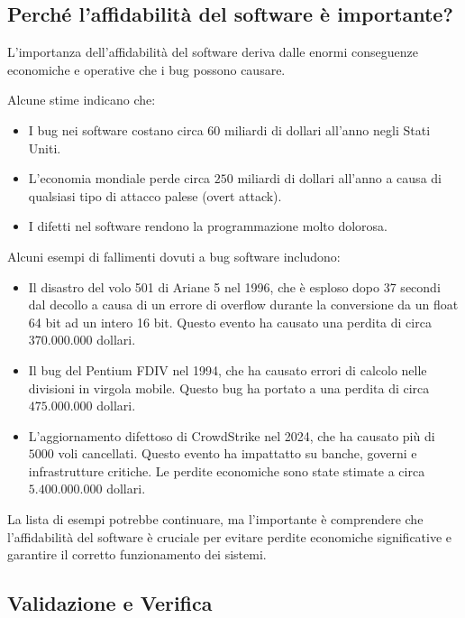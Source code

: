 \subsection{Perché l'affidabilità del software è importante?}

L'importanza dell'affidabilità del software deriva dalle enormi conseguenze
economiche e operative che i bug possono causare.

Alcune stime indicano che:
\begin{itemize}
    \item I bug nei software costano circa \(60\) miliardi di dollari all'anno
    negli Stati Uniti.
    \item L'economia mondiale perde circa \(250\) miliardi di dollari all'anno
    a causa di qualsiasi tipo di attacco palese (overt attack).
    \item I difetti nel software rendono la programmazione molto dolorosa.
\end{itemize}

Alcuni esempi di fallimenti dovuti a bug software includono:
\begin{itemize}
    \item Il disastro del volo 501 di Ariane 5 nel 1996, che è esploso dopo 37 secondi
    dal decollo a causa di un errore di overflow durante la conversione da un float 64 bit ad un intero 16 bit.
    Questo evento ha causato una perdita di circa \(370.000.000\) dollari.
    \item Il bug del Pentium FDIV nel 1994, che ha causato errori di calcolo
    nelle divisioni in virgola mobile. Questo bug ha portato a una perdita di
    circa \(475.000.000\) dollari.
    \item L'aggiornamento difettoso di CrowdStrike nel 2024, che ha causato
    più di \(5000\) voli cancellati. Questo evento ha impattatto su banche,
    governi e infrastrutture critiche. Le perdite economiche sono state
    stimate a circa \(5.400.000.000\) dollari.
\end{itemize}

La lista di esempi potrebbe continuare, ma l'importante è comprendere
che l'affidabilità del software è cruciale per evitare perdite economiche
significative e garantire il corretto funzionamento dei sistemi.

\subsection{Validazione e Verifica}

